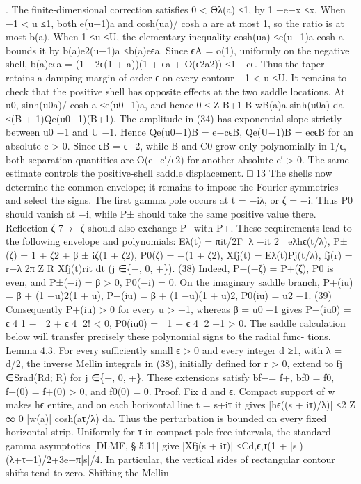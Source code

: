 .
The ﬁnite-dimensional correction satisﬁes 0 < Θλ(a) ≤1, by 1 −e−x ≤x. When −1 < u ≤1,
both e(u−1)a and cosh(ua)/ cosh a are at most 1, so the ratio is at most b(a). When 1 ≤u ≤U,
the elementary inequality cosh(ua) ≤e(u−1)a cosh a bounds it by b(a)e2(u−1)a ≤b(a)eϵa. Since
ϵA = o(1), uniformly on the negative shell,
b(a)eϵa = (1 −2ϵ(1 + a))(1 + ϵa + O(ϵ2a2)) ≤1 −cϵ.
Thus the taper retains a damping margin of order ϵ on every contour −1 < u ≤U.
It remains to check that the positive shell has opposite eﬀects at the two saddle locations. At
u0, sinh(u0a)/ cosh a ≤e(u0−1)a, and hence
0 ≤
Z B+1
B
wB(a)a sinh(u0a) da ≤(B + 1)Qe(u0−1)(B+1).
The amplitude in (34) has exponential slope strictly between u0 −1 and U −1. Hence
Qe(u0−1)B = e−cϵB,
Qe(U−1)B = ecϵB
for an absolute c > 0. Since ϵB = ϵ−2, while B and C0 grow only polynomially in 1/ϵ, both
separation quantities are O(e−c′/ϵ2) for another absolute c′ > 0. The same estimate controls the
positive-shell saddle displacement.
□
13
The shells now determine the common envelope; it remains to impose the Fourier symmetries
and select the signs. The ﬁrst gamma pole occurs at t = −iλ, or ζ = −i. Thus P0 should vanish
at −i, while P± should take the same positive value there. Reﬂection ζ 7→−ζ should also
exchange P−with P+. These requirements lead to the following envelope and polynomials:
Eλ(t) = πit/2Γ
λ −it
2

eλhϵ(t/λ),
P±(ζ) = 1 + ζ2 + β ± iζ(1 + ζ2),
P0(ζ) = −(1 + ζ2),
Xfj(t) = Eλ(t)Pj(t/λ),
fj(r) = r−λ
2π
Z
R
Xfj(t)rit dt
(j ∈\{−, 0, +\}).
(38)
Indeed, P−(−ζ) = P+(ζ), P0 is even, and
P±(−i) = β > 0,
P0(−i) = 0.
On the imaginary saddle branch,
P+(iu) = β + (1 −u)2(1 + u),
P−(iu) = β + (1 −u)(1 + u)2,
P0(iu) = u2 −1.
(39)
Consequently P+(iu) > 0 for every u > −1, whereas β = u0 −1 gives
P−(iu0) = ϵ
4
1 −

2 + ϵ
4
2!
< 0,
P0(iu0) =

1 + ϵ
4
2
−1 > 0.
The saddle calculation below will transfer precisely these polynomial signs to the radial func-
tions.
Lemma 4.3. For every suﬃciently small ϵ > 0 and every integer d ≥1, with λ = d/2, the
inverse Mellin integrals in (38), initially deﬁned for r > 0, extend to fj ∈Srad(Rd; R) for
j ∈\{−, 0, +\}. These extensions satisfy bf−= f+, bf0 = f0, f−(0) = f+(0) > 0, and f0(0) = 0.
Proof. Fix d and ϵ. Compact support of w makes hϵ entire, and on each horizontal line t = s+iτ
it gives
|hϵ((s + iτ)/λ)| ≤2
Z ∞
0
|w(a)| cosh(aτ/λ) da.
Thus the perturbation is bounded on every ﬁxed horizontal strip. Uniformly for τ in compact
pole-free intervals, the standard gamma asymptotics [DLMF, § 5.11] give
|Xfj(s + iτ)| ≤Cd,ϵ,τ(1 + |s|)(λ+τ−1)/2+3e−π|s|/4.
In particular, the vertical sides of rectangular contour shifts tend to zero. Shifting the Mellin
